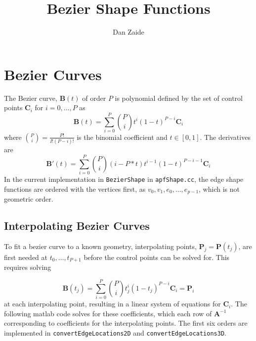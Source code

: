 \documentclass{article}
\title{Bezier Shape Functions}
\author{Dan Zaide}
\begin{document}
\maketitle

\section{Bezier Curves}
The Bezier curve, $\mathbf{B}(t)$ of order $P$ is polynomial defined by the set of control points $\mathbf{C}_i$ for $i = 0,\ldots,P$ as 
\[
\mathbf{B}(t) = \displaystyle \sum_{i=0}^P {P \choose i}t^i(1-t)^{P-i}\mathbf{C}_i
\]
where ${P \choose i}= \frac{P!}{I!(P-i)!}$ is the binomial coefficient and $ t \in [0,1]$. The derivatives are
\[
\mathbf{B}'(t) = \displaystyle \sum_{i=0}^P {P \choose i}(i-P*t)t^{i-1}(1-t)^{P-i-1}\mathbf{C}_i
\]
In the current implementation in \texttt{BezierShape} in \texttt{apfShape.cc}, the edge shape functions are ordered with the vertices first, as $v_0,v_1,e_0,\ldots,e_{p-1}$, which is not geometric order.
\subsection{Interpolating Bezier Curves}
To fit a bezier curve to a known geometry, interpolating points, $\mathbf{P}_j = \mathbf{P}(t_j)$, are first needed at $t_0,\ldots, t_{P+1}$ before the control points can be solved for. This requires solving

\[
\mathbf{B}(t_j) = \displaystyle \sum_{i=0}^P {P \choose i}t_j^i(1-t_j)^{P-i}\mathbf{C}_i = \mathbf{P}_i
\]
at each interpolating point, resulting in a linear system of equations for $\mathbf{C}_i$. The following matlab code solves for these coefficients, which each row of $\mathbf{A}^{-1}$ corresponding to coefficients for the interpolating points. The first six orders are implemented in \texttt{convertEdgeLocations2D} and \texttt{convertEdgeLocations3D}.
\end{document}
